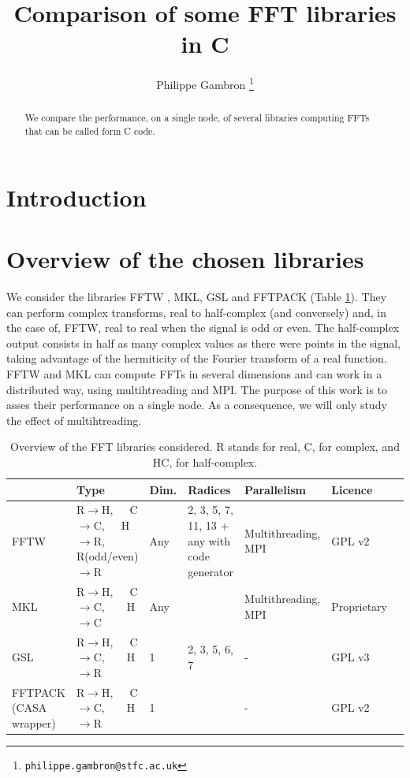 \documentclass[12pt, a4paper]{article}
\begin{document}
\title{Comparison of some FFT libraries in C}
\author{Philippe Gambron \thanks{\texttt{philippe.gambron{@}stfc.ac.uk}}}
\maketitle
\begin{abstract}
We compare the performance, on a single node, of several libraries computing FFTs that can be called form C code. 
\end{abstract}
\section{Introduction}
\section{Overview of the chosen libraries}

We consider the libraries FFTW \cite{fftw}, MKL, GSL \cite{gsl} and FFTPACK \cite{fftpack} (Table \ref{ffttable}). They can perform complex transforms, real to half-complex (and conversely) and, in the case of, FFTW, real to real when the signal is odd or even. The half-complex output consists in half as many complex values as there were points in the signal, taking advantage of the hermiticity of the Fourier transform of a real function.\\

FFTW and MKL can compute FFTs in several dimensions and can work in a distributed way, using multihtreading and MPI. The purpose of this work is to asses their performance on a single node. As a consequence, we will only study the effect of multihtreading. 
\begin{table}[H]
\captionsetup{width=1\textwidth}
\begin{tabular}{|p{2.5cm}||p{2.5cm}|p{1cm}|p{3cm}|p{3cm}|p{2cm}|p{2cm}|}
\hline
& Type & Dim. & Radices & Parallelism & Licence \\
\hline
\hline
FFTW & R$\to$H,\ \ \  C$\to$C,\ \ \  H$\to$R, R{\scriptsize (odd/even)}$\to$R& Any&2, 3, 5, 7, 11, 13 + any with code generator & Multithreading, MPI & GPL v2\\
\hline
MKL  &  R$\to$H,\ \ \  C$\to$C,\ \ \ \  H$\to$C& Any & & Multithreading, MPI & Proprietary\\
\hline
GSL  &  R$\to$H,\ \ \  C$\to$C,\ \ \ \  H$\to$R & 1 & 2, 3, 5, 6, 7 & - & GPL v3\\
\hline
FFTPACK {\scriptsize (CASA wrapper)} &  R$\to$H,\ \ \  C$\to$C,\ \ \ \  H$\to$R & 1 & & - & GPL v2\\
\hline
\end{tabular}
\caption{Overview of the FFT libraries considered. R stands for real, C, for complex, and HC, for half-complex.}
\label{ffttable}
\end{table}
\end{document}
